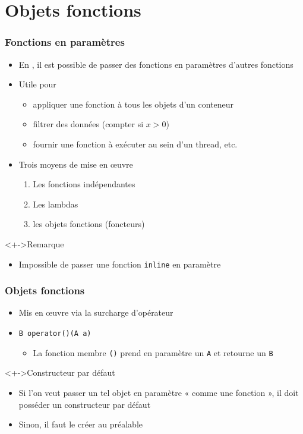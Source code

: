 \section{Objets fonctions}

\begin{frame}
\frametitle{Fonctions en paramètres}
\begin{itemize}[<+->]
\item En \cpp, il est possible de passer des fonctions en paramètres d'autres fonctions
\item Utile pour
	\begin{itemize}
	\item appliquer une fonction à tous les objets d'un conteneur
	\item filtrer des données (compter si $x > 0$)
	\item fournir une fonction à exécuter au sein d'un thread, etc.
	\end{itemize}
\item Trois moyens de mise en œuvre
	\begin{enumerate}
	\item Les fonctions indépendantes
	\item Les lambdas
	\item les objets fonctions (foncteurs)
	\end{enumerate}
\end{itemize}
\begin{alertblock}<+->{Remarque}
	\begin{itemize}[<+->]
	\item Impossible de passer une fonction \lstinline|inline| en paramètre
	\end{itemize}
\end{alertblock}
\end{frame}

\begin{frame}
\frametitle{Objets fonctions}
\begin{itemize}[<+->]
\item Mis en œuvre via la surcharge d'opérateur
\item \lstinline|B operator()(A a)|
	\begin{itemize}
	\item La fonction membre \texttt{()} prend en paramètre un \texttt{A} et retourne un \texttt{B}
	\end{itemize}
\end{itemize}
\begin{alertblock}<+->{Constructeur par défaut}
	\begin{itemize}[<+->]
	\item Si l'on veut passer un tel objet en paramètre « comme une fonction », il doit posséder un constructeur par défaut
	\item Sinon, il faut le créer au préalable
	\end{itemize}
\end{alertblock}
\end{frame}

